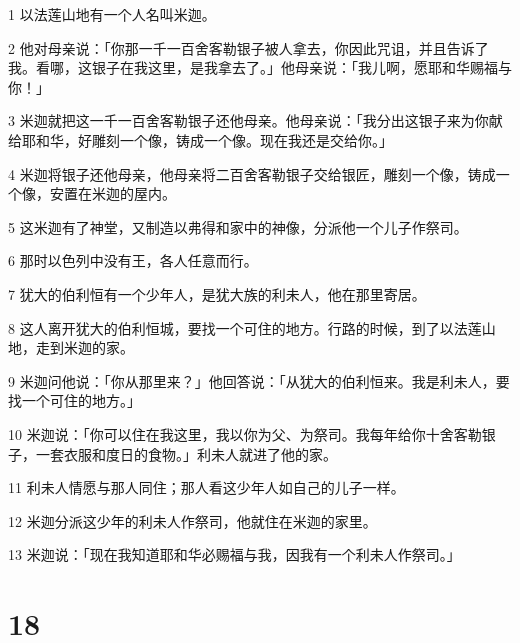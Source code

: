 \par 1 以法莲山地有一个人名叫米迦。
\par 2 他对母亲说：「你那一千一百舍客勒银子被人拿去，你因此咒诅，并且告诉了我。看哪，这银子在我这里，是我拿去了。」他母亲说：「我儿啊，愿耶和华赐福与你！」
\par 3 米迦就把这一千一百舍客勒银子还他母亲。他母亲说：「我分出这银子来为你献给耶和华，好雕刻一个像，铸成一个像。现在我还是交给你。」
\par 4 米迦将银子还他母亲，他母亲将二百舍客勒银子交给银匠，雕刻一个像，铸成一个像，安置在米迦的屋内。
\par 5 这米迦有了神堂，又制造以弗得和家中的神像，分派他一个儿子作祭司。
\par 6 那时以色列中没有王，各人任意而行。
\par 7 犹大的伯利恒有一个少年人，是犹大族的利未人，他在那里寄居。
\par 8 这人离开犹大的伯利恒城，要找一个可住的地方。行路的时候，到了以法莲山地，走到米迦的家。
\par 9 米迦问他说：「你从那里来？」他回答说：「从犹大的伯利恒来。我是利未人，要找一个可住的地方。」
\par 10 米迦说：「你可以住在我这里，我以你为父、为祭司。我每年给你十舍客勒银子，一套衣服和度日的食物。」利未人就进了他的家。
\par 11 利未人情愿与那人同住；那人看这少年人如自己的儿子一样。
\par 12 米迦分派这少年的利未人作祭司，他就住在米迦的家里。
\par 13 米迦说：「现在我知道耶和华必赐福与我，因我有一个利未人作祭司。」

\chapter{18}

